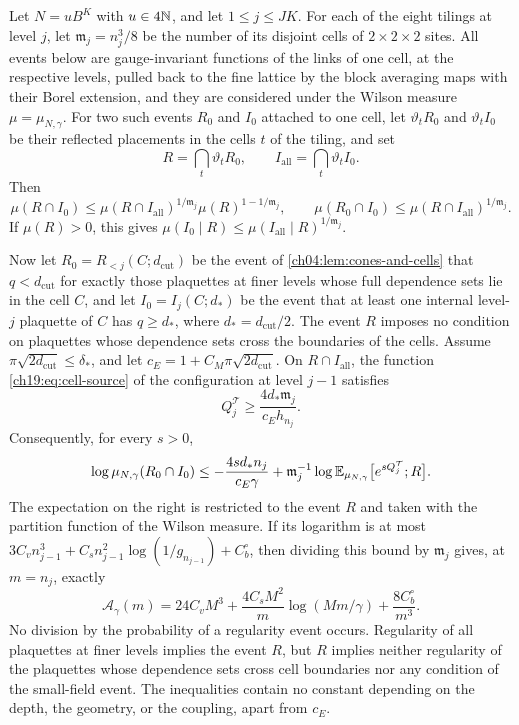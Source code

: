 \begin{lemma}\label{ch19:lem:marked-chessboard}
Let $N=uB^K$ with $u\in4\mathbb N$, and let $1\le j\le JK$. For each of the eight tilings at level $j$, let $\mathfrak m_j=n_j^3/8$ be the number of its disjoint cells of $2\times2\times2$ sites. All events below are gauge-invariant functions of the links of one cell, at the respective levels, pulled back to the fine lattice by the block averaging maps with their Borel extension, and they are considered under the Wilson measure $\mu=\mu_{N,\gamma}$. For two such events $R_0$ and $I_0$ attached to one cell, let $\vartheta_tR_0$ and $\vartheta_tI_0$ be their reflected placements in the cells $t$ of the tiling, and set
\[
 R=\bigcap_t\vartheta_tR_0,\qquad I_{\mathrm{all}}=\bigcap_t\vartheta_tI_0.
\]
Then
\[
 \mu(R\cap I_0)\le\mu(R\cap I_{\mathrm{all}})^{1/\mathfrak m_j}\mu(R)^{1-1/\mathfrak m_j},\qquad
 \mu(R_0\cap I_0)\le\mu(R\cap I_{\mathrm{all}})^{1/\mathfrak m_j}.
\]
If $\mu(R)>0$, this gives $\mu(I_0\mid R)\le\mu(I_{\mathrm{all}}\mid R)^{1/\mathfrak m_j}$.

Now let $R_0=R_{<j}(C;d_{\mathrm{cut}})$ be the event of \cref{ch04:lem:cones-and-cells} that $q<d_{\mathrm{cut}}$ for exactly those plaquettes at finer levels whose full dependence sets lie in the cell $C$, and let $I_0=I_j(C;d_*)$ be the event that at least one internal level-$j$ plaquette of $C$ has $q\ge d_*$, where $d_*=d_{\mathrm{cut}}/2$. The event $R$ imposes no condition on plaquettes whose dependence sets cross the boundaries of the cells. Assume $\pi\sqrt{2d_{\mathrm{cut}}}\le\delta_*$, and let $c_E=1+C_M\pi\sqrt{2d_{\mathrm{cut}}}$. On $R\cap I_{\mathrm{all}}$, the function \eqref{ch19:eq:cell-source} of the configuration at level $j-1$ satisfies
\[
 Q_j^{\mathcal T}\ge\frac{4d_*\mathfrak m_j}{c_Eh_{n_j}}.
\]
Consequently, for every $s>0$,
\[
 \log\mu_{N,\gamma}(R_0\cap I_0)\le-\frac{4sd_*n_j}{c_E\gamma}+\mathfrak m_j^{-1}\log\mathbb E_{\mu_{N,\gamma}}\bigl[e^{sQ_j^{\mathcal T}};R\bigr].
\]
The expectation on the right is restricted to the event $R$ and taken with the partition function of the Wilson measure. If its logarithm is at most $3C_vn_{j-1}^3+C_sn_{j-1}^2\log(1/g_{n_{j-1}})+C_b^\circ$, then dividing this bound by $\mathfrak m_j$ gives, at $m=n_j$, exactly
\[
 \mathcal A_\gamma(m)=24C_vM^3+\frac{4C_sM^2}{m}\log(Mm/\gamma)+\frac{8C_b^\circ}{m^3}.
\]
No division by the probability of a regularity event occurs. Regularity of all plaquettes at finer levels implies the event $R$, but $R$ implies neither regularity of the plaquettes whose dependence sets cross cell boundaries nor any condition of the small-field event. The inequalities contain no constant depending on the depth, the geometry, or the coupling, apart from $c_E$.
\end{lemma}

